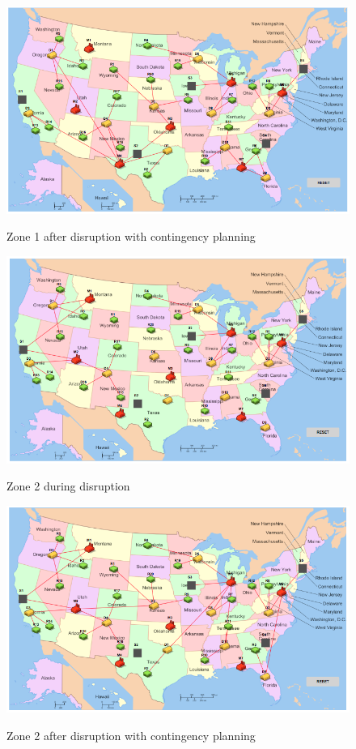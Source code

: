 \begin{figure}[H]
  \centering
  \includegraphics[width=6.5in]{figures/pdf/Z1AD.png}\\
  \caption{Zone 1 after disruption with contingency planning}\label{Z1AD}
\end{figure}  

\begin{figure}[H]
  \centering
  \includegraphics[width=6.5in]{figures/pdf/Z2BD.png}\\
  \caption{Zone 2 during disruption}\label{Z2BD}
\end{figure}  

\begin{figure}[H]
  \centering
  \includegraphics[width=6.5in]{figures/pdf/Z2AD.png}\\
  \caption{Zone 2 after disruption with contingency planning}\label{Z2AD}
\end{figure}  

